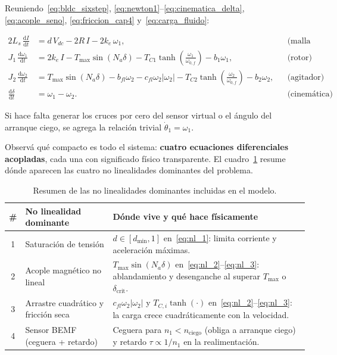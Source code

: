 \documentclass[11pt,a4paper,oneside]{book}
\newcommand{\dd}{\mathrm{d}}
\begin{document}
Reuniendo~\eqref{eq:bldc_sixstep}, \eqref{eq:newton1}--\eqref{eq:cinematica_delta},
\eqref{eq:acople_seno}, \eqref{eq:friccion_cap4} y~\eqref{eq:carga_fluido}:
\begin{ecuacionclave}
\begin{align}
  2L_s\,\frac{\dd I}{\dd t}        &= d\,V_{dc} - 2R\,I - 2k_e\,\omega_1,
  &&\text{(malla eléctrica)} \label{eq:nl_1}\\[3pt]
  J_1\,\frac{\dd\omega_1}{\dd t}   &= 2k_e\,I - T_{\max}\sin(N_a\delta)
                                    - T_{C1}\tanh\!\left(\frac{\omega_1}{\omega_{0,f}}\right) - b_1\omega_1,
  &&\text{(rotor)} \label{eq:nl_2}\\[3pt]
  J_2\,\frac{\dd\omega_2}{\dd t}   &= T_{\max}\sin(N_a\delta) - b_{fl}\omega_2 - c_{fl}\omega_2|\omega_2|
                                    - T_{C2}\tanh\!\left(\frac{\omega_2}{\omega_{0,f}}\right) - b_2\omega_2,
  &&\text{(agitador)} \label{eq:nl_3}\\[3pt]
  \frac{\dd\delta}{\dd t}          &= \omega_1 - \omega_2.
  &&\text{(cinemática)} \label{eq:nl_4}
\end{align}
\end{ecuacionclave}
Si hace falta generar los cruces por cero del sensor virtual o el ángulo del
arranque ciego, se agrega la relación trivial $\dot\theta_1 = \omega_1$.

Observá qué compacto es todo el sistema: \textbf{cuatro ecuaciones diferenciales
acopladas}, cada una con significado físico transparente. El cuadro~\ref{tab:resumen_nl}
resume dónde aparecen las cuatro no linealidades dominantes del problema.

\begin{table}[htbp]
\centering
\small
\begin{tabular}{@{}cl>{\raggedright\arraybackslash}p{6.8cm}@{}}
\toprule
\# & No linealidad dominante & Dónde vive y qué hace físicamente \\
\midrule
1 & Saturación de tensión & $d \in [d_{\min}, 1]$ en~\eqref{eq:nl_1}: limita corriente y aceleración máximas. \\
2 & Acople magnético no lineal & $T_{\max}\sin(N_a\delta)$ en~\eqref{eq:nl_2}--\eqref{eq:nl_3}: ablandamiento y desenganche al superar $T_{\max}$ o $\delta_{\text{crit}}$. \\
3 & Arrastre cuadrático y fricción seca & $c_{fl}\omega_2|\omega_2|$ y $T_{C,i}\tanh(\cdot)$ en~\eqref{eq:nl_2}--\eqref{eq:nl_3}: la carga crece cuadráticamente con la velocidad. \\
4 & Sensor BEMF (ceguera + retardo) & Ceguera para $n_1 < n_{\text{ciego}}$ (obliga a arranque ciego) y retardo $\tau \propto 1/n_1$ en la realimentación. \\
\bottomrule
\end{tabular}
\caption{Resumen de las no linealidades dominantes incluidas en el modelo.}
\label{tab:resumen_nl}
\end{table}
\end{document}
